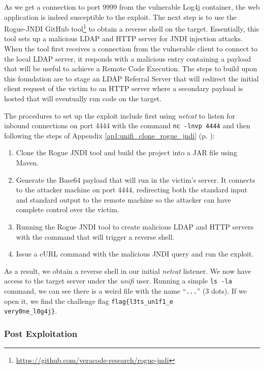 As we get a connection to port 9999 from the vulnerable Log4j container, the web application is indeed susceptible to the exploit. The next step is to use the Rogue-JNDI GitHub tool\footnote{\url{https://github.com/veracode-research/rogue-jndi}} to obtain a reverse shell on the target. Essentially, this tool sets up a malicious LDAP and HTTP server for JNDI injection attacks. When the tool first receives a connection from the vulnerable client to connect to the local LDAP server, it responds with a malicious entry containing a payload that will be useful to achieve a Remote Code Execution. The steps to build upon this foundation are to stage an LDAP Referral Server that will redirect the initial client request of the victim to an HTTP server where a secondary payload is hosted that will eventually run code on the target. 

The procedures to set up the exploit include first using \textit{netcat} to listen for inbound connections on port 4444 with the command \texttt{nc -lnvp 4444} and then following the steps of Appendix \ref{ap1:unifi_clone_rogue_jndi} (p. \pageref{ap1:unifi_clone_rogue_jndi}):

\begin{enumerate}
    \item Clone the Rogue JNDI tool and build the project into a JAR file using Maven.
    \item Generate the Base64 payload that will run in the victim's server. It connects to the attacker machine on port 4444, redirecting both the standard input and standard output to the remote machine so the attacker can have complete control over the victim.
    \item Running the Rogue JNDI tool to create malicious LDAP and HTTP servers with the command that will trigger a reverse shell.
    \item Issue a cURL command with the malicious JNDI query and run the exploit.
\end{enumerate}

As a result, we obtain a reverse shell in our initial \textit{netcat} listener. We now have access to the target server under the \textit{unifi} user. Running a simple \texttt{ls -la} command, we can see there is a weird file with the name ``\texttt{...}'' (3 dots). If we open it, we find the challenge flag \texttt{flag\{l3ts\_un1f1\_e\\very0ne\_l0g4j\}}.

\subsubsection{Post Exploitation} \label{sec:validation_log4j_post_exploitation}

